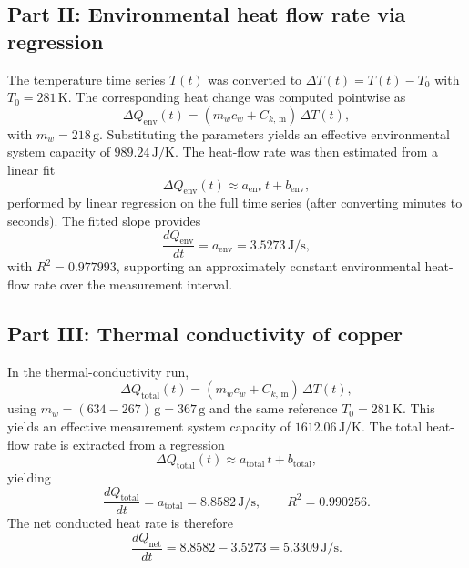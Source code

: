 \documentclass[journal]{IEEEtran}
\begin{document}
\subsection{Part II: Environmental heat flow rate via regression}
The temperature time series $T(t)$ was converted to $\Delta T(t)=T(t)-T_0$ with
$T_0 = 281\,\text{K}$. The corresponding heat change was computed pointwise as
\begin{equation}
    \Delta Q_{\text{env}}(t) = \left(m_w c_w + C_{k,\,\text{m}}\right)\,\Delta T(t),
\end{equation}
with $m_w = 218\,\text{g}$. Substituting the parameters yields an effective environmental system capacity of $989.24\,\text{J/K}$. The heat-flow rate was then estimated from a linear fit
\begin{equation}
    \Delta Q_{\text{env}}(t) \approx a_{\text{env}}\,t + b_{\text{env}},
\end{equation}
performed by linear regression on the full time series (after converting
minutes to seconds). The fitted slope provides
\begin{equation}
    \frac{dQ_{\text{env}}}{dt} = a_{\text{env}} = 3.5273\,\text{J/s},
\end{equation}
with $R^2=0.977993$, supporting an approximately constant environmental heat-flow rate
over the measurement interval.

\subsection{Part III: Thermal conductivity of copper}
In the thermal-conductivity run,
\begin{equation}
    \Delta Q_{\text{total}}(t) = \left(m_w c_w + C_{k,\,\text{m}}\right)\,\Delta T(t),
\end{equation}
using $m_w = (634-267)\,\text{g} = 367\,\text{g}$ and the same reference $T_0=281\,\text{K}$. This yields an effective measurement system capacity of $1612.06\,\text{J/K}$.
The total heat-flow rate is extracted from a regression
\begin{equation}
    \Delta Q_{\text{total}}(t) \approx a_{\text{total}}\,t + b_{\text{total}},
\end{equation}
yielding
\begin{equation}
    \frac{dQ_{\text{total}}}{dt} = a_{\text{total}} = 8.8582\,\text{J/s}, \qquad R^2=0.990256.
\end{equation}
The net conducted heat rate is therefore
\begin{equation}
    \frac{dQ_{\text{net}}}{dt} = 8.8582 - 3.5273 = 5.3309\,\text{J/s}.
\end{equation}
\end{document}
